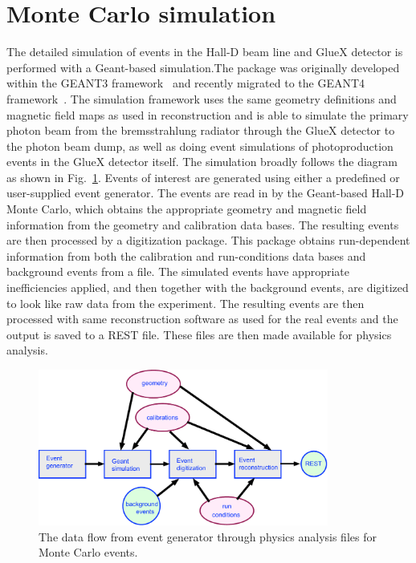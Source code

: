 \section[Monte Carlo]{Monte Carlo simulation \label{sec:simulation}}
The detailed simulation of events in the Hall-D beam line and GlueX detector is performed with a Geant-based simulation.The package was originally developed within the GEANT3 framework~\cite{Brun:1987ma} and recently migrated to the GEANT4 framework~\cite{Agostinelli:2002hh,Allison:2016lfl}. The simulation framework uses the same geometry definitions and magnetic field maps as used in reconstruction and is able to simulate the primary photon beam from the bremsstrahlung radiator through the GlueX detector to the photon beam dump, as well as doing event simulations of photoproduction events in the GlueX detector itself. The simulation broadly follows the diagram as shown in Fig.~\ref{fig:MC-data-flow}. Events of interest are generated using either a predefined or user-supplied event generator. The events are read in by the Geant-based Hall-D Monte Carlo, which obtains the appropriate geometry and magnetic field information from the geometry and calibration data bases. The resulting events are then processed by a digitization package. This package obtains run-dependent information from both the calibration and run-conditions data bases and background events from a file. The simulated events have appropriate inefficiencies applied, and then together with the background events, are digitized to look like raw data from the experiment. The resulting events are then processed with same reconstruction software as used for the real events and the output is saved to a REST file. These files are then made available for physics analysis.
\begin{figure}[h!]\centering
\includegraphics[width=0.85\textwidth]{figures/MC-data-flow.pdf}
\caption[]{\label{fig:MC-data-flow}The data flow from event generator through physics analysis files for Monte Carlo events.}
\end{figure}
